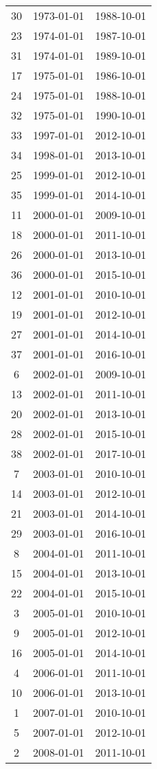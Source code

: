 % 
\begin{tabular}{ccc}
  \hline
  \hline
30 & 1973-01-01 & 1988-10-01 \\ 
  23 & 1974-01-01 & 1987-10-01 \\ 
  31 & 1974-01-01 & 1989-10-01 \\ 
  17 & 1975-01-01 & 1986-10-01 \\ 
  24 & 1975-01-01 & 1988-10-01 \\ 
  32 & 1975-01-01 & 1990-10-01 \\ 
  33 & 1997-01-01 & 2012-10-01 \\ 
  34 & 1998-01-01 & 2013-10-01 \\ 
  25 & 1999-01-01 & 2012-10-01 \\ 
  35 & 1999-01-01 & 2014-10-01 \\ 
  11 & 2000-01-01 & 2009-10-01 \\ 
  18 & 2000-01-01 & 2011-10-01 \\ 
  26 & 2000-01-01 & 2013-10-01 \\ 
  36 & 2000-01-01 & 2015-10-01 \\ 
  12 & 2001-01-01 & 2010-10-01 \\ 
  19 & 2001-01-01 & 2012-10-01 \\ 
  27 & 2001-01-01 & 2014-10-01 \\ 
  37 & 2001-01-01 & 2016-10-01 \\ 
  6 & 2002-01-01 & 2009-10-01 \\ 
  13 & 2002-01-01 & 2011-10-01 \\ 
  20 & 2002-01-01 & 2013-10-01 \\ 
  28 & 2002-01-01 & 2015-10-01 \\ 
  38 & 2002-01-01 & 2017-10-01 \\ 
  7 & 2003-01-01 & 2010-10-01 \\ 
  14 & 2003-01-01 & 2012-10-01 \\ 
  21 & 2003-01-01 & 2014-10-01 \\ 
  29 & 2003-01-01 & 2016-10-01 \\ 
  8 & 2004-01-01 & 2011-10-01 \\ 
  15 & 2004-01-01 & 2013-10-01 \\ 
  22 & 2004-01-01 & 2015-10-01 \\ 
  3 & 2005-01-01 & 2010-10-01 \\ 
  9 & 2005-01-01 & 2012-10-01 \\ 
  16 & 2005-01-01 & 2014-10-01 \\ 
  4 & 2006-01-01 & 2011-10-01 \\ 
  10 & 2006-01-01 & 2013-10-01 \\ 
  1 & 2007-01-01 & 2010-10-01 \\ 
  5 & 2007-01-01 & 2012-10-01 \\ 
  2 & 2008-01-01 & 2011-10-01 \\ 
   \hline
\end{tabular}
